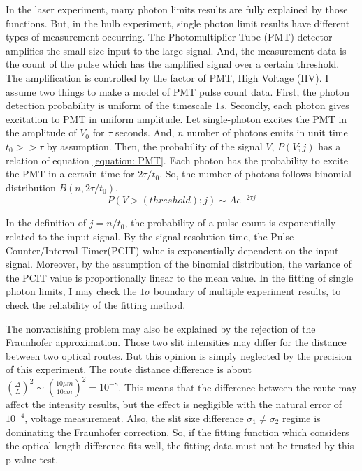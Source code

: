 \documentclass{article}
\begin{document}
 In the laser experiment, many photon limits results are fully explained by those functions.
 But, in the bulb experiment, single photon limit results have different types of measurement occurring.
 The Photomultiplier Tube (PMT) detector amplifies the small size input to the large signal.
 And, the measurement data is the count of the pulse which has the amplified signal over a certain threshold.
 The amplification is controlled by the factor of PMT, High Voltage (HV).
 I assume two things to make a model of PMT pulse count data.
 First, the photon detection probability is uniform of the timescale $1s$.
 Secondly, each photon gives excitation to PMT in uniform amplitude.
 Let single-photon excites the PMT in the amplitude of $V_0$ for $\tau$ seconds.
 And, $n$ number of photons emits in unit time $t_0 >> \tau$ by assumption.
 Then, the probability of the signal $V$, $P(V;j)$ has a relation of equation \ref{equation: PMT}.
 Each photon has the probability to excite the PMT in a certain time for $2\tau/t_0$.
 So, the number of photons follows binomial distribution $B(n,2\tau/t_0)$.
 \begin{equation}
    P(V>(threshold);j) \sim A e^{-2\tau j}
    \label{equation: PMT}
 \end{equation}

 In the definition of $j = n/t_0$, the probability of a pulse count is exponentially related to the input signal.
 By the signal resolution time, the Pulse Counter/Interval Timer(PCIT) value is exponentially dependent on the input signal.
 Moreover, by the assumption of the binomial distribution, the variance of the PCIT value is proportionally linear to the mean value.
 In the fitting of single photon limits, I may check the $1\sigma$ boundary of multiple experiment results, to check the reliability of the fitting method.


 The nonvanishing problem may also be explained by the rejection of the Fraunhofer approximation.
 Those two slit intensities may differ for the distance between two optical routes.
 But this opinion is simply neglected by the precision of this experiment.
 The route distance difference is about $(\frac{\Delta}{L})^2 \sim (\frac{10\mu m}{10 cm})^2 = 10^{-8}$.
 This means that the difference between the route may affect the intensity results, but the effect is negligible with the natural error of $10^{-4}$, voltage measurement.
 Also, the slit size difference $\sigma_1 \neq \sigma_2$ regime is dominating the Fraunhofer correction.
 So, if the fitting function which considers the optical length difference fits well, the fitting data must not be trusted by this p-value test.
\end{document}
